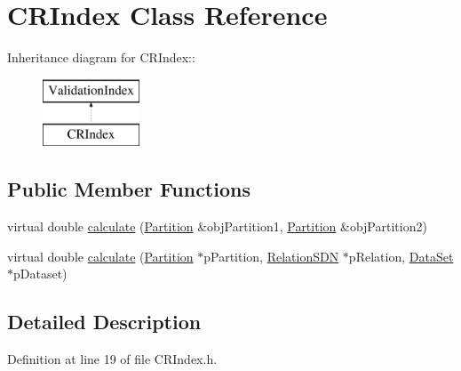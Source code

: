\hypertarget{classCRIndex}{
\section{CRIndex Class Reference}
\label{classCRIndex}
}
Inheritance diagram for CRIndex::\begin{figure}[H]
\begin{center}
\leavevmode
\includegraphics[height=2cm]{classCRIndex}
\end{center}
\end{figure}
\subsection*{Public Member Functions}
\begin{DoxyCompactItemize}
\item 
virtual double \hyperlink{classCRIndex_acfcf9186a522c78d67cc977aeddaf193}{calculate} (\hyperlink{classPartition}{Partition} \&objPartition1, \hyperlink{classPartition}{Partition} \&objPartition2)
\item 
virtual double \hyperlink{classCRIndex_a384b9fc6a5d271c13f7b599f17771041}{calculate} (\hyperlink{classPartition}{Partition} $\ast$pPartition, \hyperlink{classRelationSDN}{RelationSDN} $\ast$pRelation, \hyperlink{classDataSet}{DataSet} $\ast$pDataset)
\end{DoxyCompactItemize}


\subsection{Detailed Description}


Definition at line 19 of file CRIndex.h.


